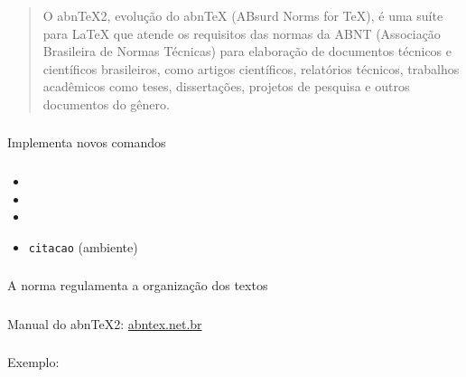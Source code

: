 \begin{frame}[standout]
  \Huge
\end{frame}

\begin{frame}
  \frametitle{}
  \large
  \begin{quote}
    O abnTeX2, evolução do abnTeX (ABsurd Norms for TeX), é uma suíte para
    LaTeX que atende os requisitos das normas da ABNT (Associação Brasileira de
    Normas Técnicas) para elaboração de documentos técnicos e científicos
    brasileiros, como artigos científicos, relatórios técnicos, trabalhos
    acadêmicos como teses, dissertações, projetos de pesquisa e outros
    documentos do gênero.
  \end{quote}
\end{frame}

\begin{frame}
  \frametitle{}
  \Huge
  Implementa novos comandos
\end{frame}

\begin{frame}
  \frametitle{}
  \Huge
  \begin{itemize}
    \item\texttt{\titulo}
    \item\texttt{\autor}
    \item\texttt{\imprimircapa}
    \item\texttt{citacao} (ambiente)
  \end{itemize}
\end{frame}

\begin{frame}
  \frametitle{}
  \Huge
  A norma regulamenta a organização dos textos
\end{frame}

\begin{frame}
  \frametitle{}
  \Huge
  Manual do abnTeX2: \url{abntex.net.br}
\end{frame}

\begin{frame}
  \frametitle{}
  \Huge
  Exemplo: 
\end{frame}
